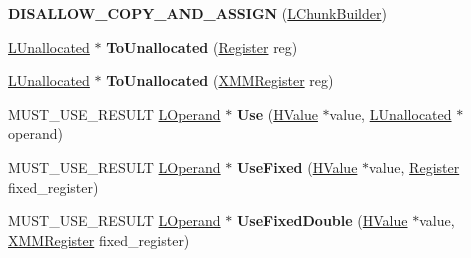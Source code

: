 \begin{DoxyCompactItemize}
\item 
{\bfseries D\+I\+S\+A\+L\+L\+O\+W\+\_\+\+C\+O\+P\+Y\+\_\+\+A\+N\+D\+\_\+\+A\+S\+S\+I\+GN} (\hyperlink{classv8_1_1internal_1_1_l_chunk_builder}{L\+Chunk\+Builder})\hypertarget{classv8_1_1internal_1_1_l_chunk_builder_a19b07322023329077a9f8c29451592b5}{}\label{classv8_1_1internal_1_1_l_chunk_builder_a19b07322023329077a9f8c29451592b5}

\item 
\hyperlink{classv8_1_1internal_1_1_l_unallocated}{L\+Unallocated} $\ast$ {\bfseries To\+Unallocated} (\hyperlink{structv8_1_1internal_1_1_register}{Register} reg)\hypertarget{classv8_1_1internal_1_1_l_chunk_builder_ae996944c8e59f0e19fe2743090135cb9}{}\label{classv8_1_1internal_1_1_l_chunk_builder_ae996944c8e59f0e19fe2743090135cb9}

\item 
\hyperlink{classv8_1_1internal_1_1_l_unallocated}{L\+Unallocated} $\ast$ {\bfseries To\+Unallocated} (\hyperlink{structv8_1_1internal_1_1_double_register}{X\+M\+M\+Register} reg)\hypertarget{classv8_1_1internal_1_1_l_chunk_builder_abc712619ecdd178517e1be85ac32998a}{}\label{classv8_1_1internal_1_1_l_chunk_builder_abc712619ecdd178517e1be85ac32998a}

\item 
M\+U\+S\+T\+\_\+\+U\+S\+E\+\_\+\+R\+E\+S\+U\+LT \hyperlink{classv8_1_1internal_1_1_l_operand}{L\+Operand} $\ast$ {\bfseries Use} (\hyperlink{classv8_1_1internal_1_1_h_value}{H\+Value} $\ast$value, \hyperlink{classv8_1_1internal_1_1_l_unallocated}{L\+Unallocated} $\ast$operand)\hypertarget{classv8_1_1internal_1_1_l_chunk_builder_accd60b3b89817c5ad33a2124e268e793}{}\label{classv8_1_1internal_1_1_l_chunk_builder_accd60b3b89817c5ad33a2124e268e793}

\item 
M\+U\+S\+T\+\_\+\+U\+S\+E\+\_\+\+R\+E\+S\+U\+LT \hyperlink{classv8_1_1internal_1_1_l_operand}{L\+Operand} $\ast$ {\bfseries Use\+Fixed} (\hyperlink{classv8_1_1internal_1_1_h_value}{H\+Value} $\ast$value, \hyperlink{structv8_1_1internal_1_1_register}{Register} fixed\+\_\+register)\hypertarget{classv8_1_1internal_1_1_l_chunk_builder_a61be80f9ab32bd10c228aad8844f63b7}{}\label{classv8_1_1internal_1_1_l_chunk_builder_a61be80f9ab32bd10c228aad8844f63b7}

\item 
M\+U\+S\+T\+\_\+\+U\+S\+E\+\_\+\+R\+E\+S\+U\+LT \hyperlink{classv8_1_1internal_1_1_l_operand}{L\+Operand} $\ast$ {\bfseries Use\+Fixed\+Double} (\hyperlink{classv8_1_1internal_1_1_h_value}{H\+Value} $\ast$value, \hyperlink{structv8_1_1internal_1_1_double_register}{X\+M\+M\+Register} fixed\+\_\+register)\hypertarget{classv8_1_1internal_1_1_l_chunk_builder_a7c87be2e845ebbadd4630ed2fb27d8e3}{}\label{classv8_1_1internal_1_1_l_chunk_builder_a7c87be2e845ebbadd4630ed2fb27d8e3}


\end{DoxyCompactItemize}
